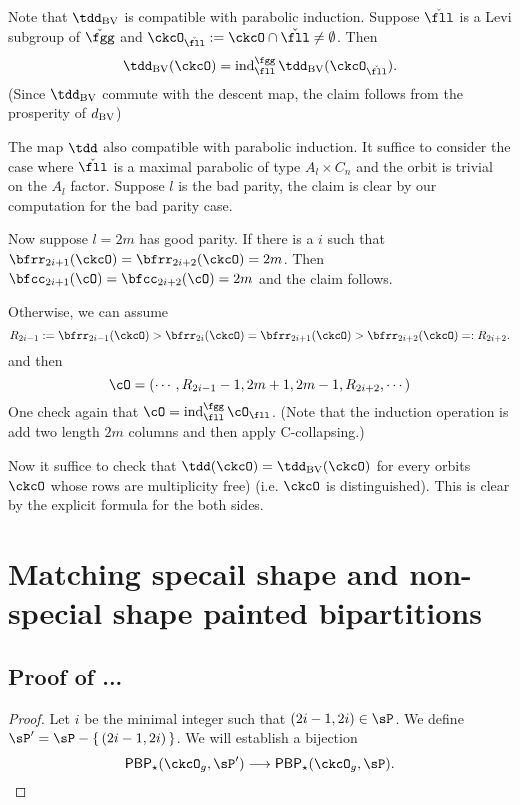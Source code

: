 \documentclass[counting_main.tex]{subfiles}
\begin{document}
{Note that $\tdBV$ is compatible with parabolic induction.
Suppose $\ckfll$ is a Levi subgroup of $\ckfgg$ and
$\ckcO_{\ckfll}:=\ckcO\cap \ckfll\neq \emptyset$.
Then
\[
\tdBV(\ckcO) = \ind_{\fll}^{\fgg} \tdBV(\ckcO_{\ckfll}).
\]
(Since $\tdBV$ commute with the descent map, the claim follows from the
prosperity of $d_{\mathrm{BV}}$)

The map $\tdd$ also compatible with parabolic induction.
It suffice to consider the case where $\ckfll$ is a maximal parabolic of type
$A_{l}\times C_{n}$ and
the orbit is trivial on the $A_{l}$ factor.
Suppose $l$ is the bad parity, the claim is clear by our computation for the bad
parity case.

Now suppose $l=2m$ has good parity. If there is a $i$ such that
$\bfrr_{2i+1}(\ckcO)=\bfrr_{2i+2}(\ckcO)=2m$. Then
$\bfcc_{2i+1}(\cO)=\bfcc_{2i+2}(\cO)=2m$ and the claim follows.

Otherwise, we can assume
\[
R_{2i-1}:=\bfrr_{2i-1}(\ckcO)> \bfrr_{2i}(\ckcO)=\bfrr_{2i+1}(\ckcO) > \bfrr_{2i+2}(\ckcO)=:R_{2i+2}.
\]
and then
\[
\cO = (\cdots, R_{2i-1}-1, 2m+1, 2m-1, R_{2i+2}, \cdots)
\]
One check again that $\cO = \ind_{\fll}^{\fgg}\cO_{\fll}$.
(Note that the induction operation is add two length $2m$ columns and then apply
C-collapsing.)

Now it suffice to check that
$\tdd(\ckcO) = \tdBV(\ckcO)$ for every orbits $\ckcO$ whose
rows are multiplicity free) (i.e. $\ckcO$ is distinguished).
This is clear by the explicit formula for the both sides.
}

\section{Matching specail shape and non-special shape painted bipartitions}
\label{app:comb}

\subsection{Proof of ...}
\begin{proof}
  Let $i$ be the minimal integer such that $(2i-1, 2i)\in \sP$.
  We define $\sP' = \sP - \set{(2i-1,2i)}$.
  We will establish a bijection
  \[
    \PBP_{\star}(\ckcO_{g}, \sP')\longrightarrow \PBP_{\star}(\ckcO_{g},\sP).
  \]
\end{proof}

\end{document}
